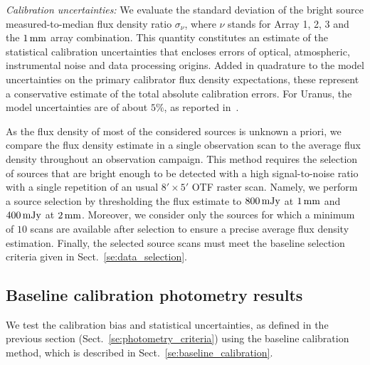 \noindent \emph{Calibration uncertainties: }We evaluate the standard
deviation of the bright source measured-to-median flux density ratio
$\sigma_{\nu}$, where $\nu$ stands for Array 1, 2, 3 and the
$1\,\rm{mm}$ array combination. This quantity constitutes an estimate
of the statistical calibration uncertainties that encloses errors of
optical, atmospheric, instrumental noise and data processing origins.
Added in quadrature to the model uncertainties on the primary
calibrator flux density expectations, %
these represent a conservative estimate of the total absolute
calibration errors. For Uranus, the model
uncertainties are of about $5\%$, as reported
in~\citet{Morenothesis,Bendo2013}.

As the flux density of most of the considered sources is unknown a priori, we
compare the flux density estimate in a single observation scan to the
average flux density throughout an observation campaign. This method
requires the selection of sources that are bright enough to be detected with a high
signal-to-noise ratio with a single repetition of an usual
$8'\times 5'$ OTF raster scan. Namely, we perform a source
selection by thresholding the flux estimate to $800\,\rm{mJy}$ at
$1\,\rm{mm}$ and $400\,\rm{mJy}$ at $2\,\rm{mm}$. Moreover, we consider
only the sources for which a minimum of $10$ scans are available after
selection to ensure a precise average flux density
estimation. Finally, the selected source scans must meet the baseline
selection criteria given in Sect.~\ref{se:data_selection}.


\subsection{Baseline calibration photometry results}
\label{se:photometry_baseline}

We test the calibration bias and statistical uncertainties, as defined
in the previous section (Sect.~\ref{se:photometry_criteria}) using the
baseline calibration method, which is described in
Sect.~\ref{se:baseline_calibration}.

